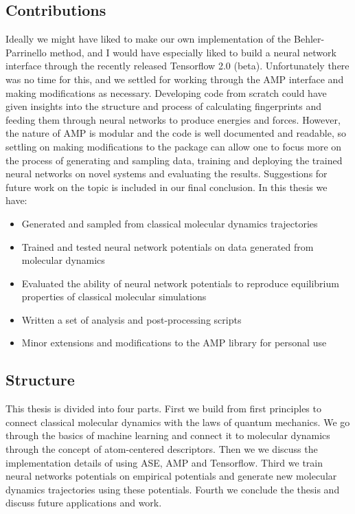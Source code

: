 \subsection{Contributions}
Ideally we might have liked to make our own implementation
of the Behler-Parrinello method,
and I would have especially liked to build a neural network interface
through the recently released Tensorflow 2.0 (beta). Unfortunately there
was no time for this, and we settled for working through the AMP interface
and making modifications as necessary.
Developing code from scratch could have given insights into the structure
and process of calculating fingerprints and feeding them through neural
networks to produce energies and forces. However, the nature of AMP
is modular and the code is well documented and readable, so 
settling on making modifications to the package can allow one to focus
more on the process of generating and sampling data, training and
deploying the trained neural networks on novel systems and evaluating the results.
Suggestions for future work on the topic
is included in our final conclusion.
In this thesis we have:

\begin{itemize}
    \item Generated and sampled from classical
        molecular dynamics trajectories
    \item Trained and tested neural network potentials
        on data generated from molecular dynamics
    \item Evaluated the ability of neural network potentials
        to reproduce equilibrium properties of classical
        molecular simulations
    \item Written a set of analysis and post-processing scripts
    \item Minor extensions and modifications to the AMP library
        for personal use
\end{itemize}

\subsection{Structure}
This thesis is divided into four parts. First we build from first principles
to connect classical molecular dynamics with the laws of quantum mechanics.
We go through the basics of machine learning
and connect it to molecular dynamics through the concept of atom-centered descriptors.
Then we we discuss the implementation details of using
ASE, AMP and Tensorflow. Third we train neural networks potentials
on empirical potentials and generate new molecular dynamics trajectories
using these potentials.
Fourth we conclude the thesis and discuss future applications and work.

